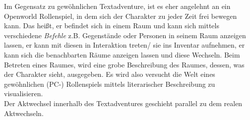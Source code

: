 \documentclass[a4paper, 12pt]{scrartcl}
\begin{document}
    Im Gegensatz zu \glqq gewöhnlichen\grqq{} Textadventure, ist es eher angelehnt an ein Openworld Rollenspiel, in dem sich der Charakter zu jeder Zeit frei bewegen kann.
    Das heißt, er befindet sich in einem Raum und kann sich mittels verschiedene \textit{Befehle} z.B. Gegenstände oder Personen in seinem Raum anzeigen lassen, er kann mit diesen in Interaktion treten/ sie ins Inventar aufnehmen, er kann sich die benachbarten Räume anzeigen lassen und diese Wechseln. 
    Beim Betreten eines Raumes, wird eine grobe Beschreibung des Raumes, dessen, was der Charakter sieht, ausgegeben. 
    Es wird also versucht die Welt eines gewöhnlichen (PC-) Rollenspiels mittels literarischer Beschreibung zu visualisieren. \\
    Der Aktwechsel innerhalb des Textadventures geschieht parallel zu dem realen Aktwechseln. 
\end{document}
